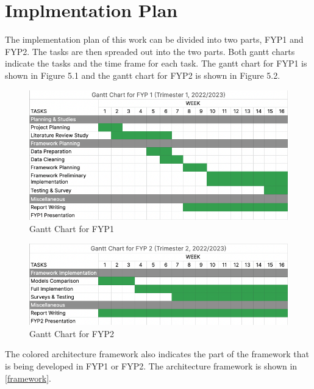 \chapter{Implmentation Plan}
The implementation plan of this work can be divided into two parts, FYP1 and FYP2. The tasks are then spreaded out into the two parts. Both gantt charts indicate the tasks and the time frame for each task. The gantt chart for FYP1 is shown in Figure 5.1 and the gantt chart for FYP2 is shown in Figure 5.2.

\begin{figure}[H]
  \centering
  \includegraphics[scale=0.60]{assets/gc-1.png}
  \caption{Gantt Chart for FYP1}
  \label{fig:gc-1}
\end{figure}

\begin{figure}[H]
  \centering
  \includegraphics[scale=0.60]{assets/gc-2.png}
  \caption{Gantt Chart for FYP2}
  \label{fig:gc-2}
\end{figure}


\noindent The colored architecture framework also indicates the part of the framework that is being developed in FYP1 or FYP2. The architecture framework is shown in \ref{framework}.